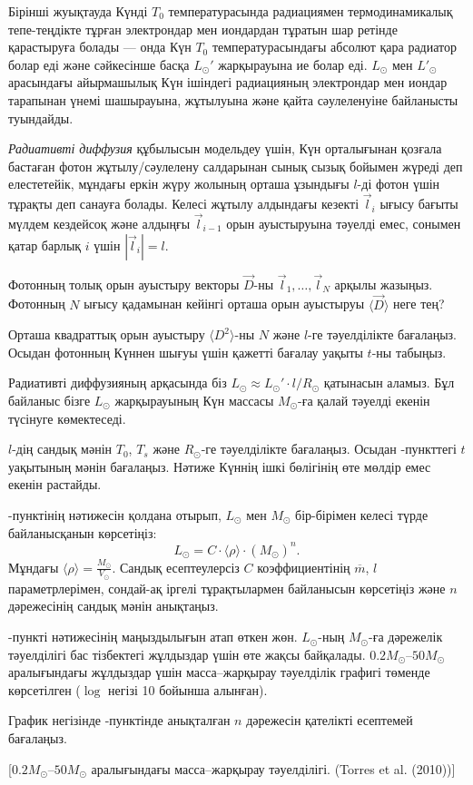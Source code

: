 
Бірінші жуықтауда Күнді $T_0$ температурасында радиациямен термодинамикалық тепе-теңдікте тұрған электрондар мен иондардан тұратын шар ретінде қарастыруға болады --- онда Күн $T_0$ температурасындағы абсолют қара радиатор болар еді және сәйкесінше басқа $L_\odot'$ жарқырауына ие болар еді. $L_\odot$ мен $L'_\odot$ арасындағы айырмашылық Күн ішіндегі радиацияның электрондар мен иондар тарапынан үнемі шашырауына, жұтылуына және қайта сәулеленуіне байланысты туындайды.

\textit{Радиативті диффузия} құбылысын модельдеу үшін, Күн орталығынан қозғала бастаған фотон жұтылу/сәулелену салдарынан сынық сызық бойымен жүреді деп елестетейік, мұндағы еркін жүру жолының орташа ұзындығы $l$-ді фотон үшін тұрақты деп санауға болады. Келесі жұтылу алдындағы кезекті $\vec l_i$ ығысу бағыты мүлдем кездейсоқ және алдыңғы $\vec l_{i-1}$ орын ауыстыруына тәуелді емес, сонымен қатар барлық $i$ үшін $|\vec l_i|=l$.

\begin{task}
\item Фотонның толық орын ауыстыру векторы $\vec D$-ны $\vec l_1,\dots,\vec l_N$ арқылы жазыңыз. Фотонның $N$ ығысу қадамынан кейінгі орташа орын ауыстыруы $\langle\vec D\rangle$ неге тең?
\item Орташа квадраттық орын ауыстыру $\langle D^2\rangle$-ны $N$ және $l$-ге тәуелділікте бағалаңыз. Осыдан фотонның Күннен шығуы үшін қажетті бағалау уақыты $t$-ны табыңыз.
\end{task}
Радиативті диффузияның арқасында біз $L_\odot \approx L_\odot'\cdot l/R_\odot$ қатынасын аламыз. Бұл байланыс бізге $L_\odot$ жарқырауының Күн массасы $M_\odot$-ға қалай тәуелді екенін түсінуге көмектеседі.
\begin{task}
\item $l$-дің сандық мәнін $T_0$, $T_s$ және $R_\odot$-ге тәуелділікте бағалаңыз. Осыдан -пункттегі $t$ уақытының мәнін бағалаңыз. Нәтиже Күннің ішкі бөлігінің өте мөлдір емес екенін растайды.
\item {}-пунктінің нәтижесін қолдана отырып, $L_\odot$ мен $M_\odot$ бір-бірімен келесі түрде байланысқанын көрсетіңіз:
$$
L_\odot = C\cdot\langle\rho\rangle\cdot(M_\odot)^n.
$$
Мұндағы $\langle\rho\rangle=\frac{M_\odot}{V_\odot}$. Сандық есептеулерсіз $C$ коэффициентінің $\overline m$, $l$ параметрлерімен, сондай-ақ іргелі тұрақтылармен байланысын көрсетіңіз және $n$ дәрежесінің сандық мәнін анықтаңыз.
\end{task}
-пункті нәтижесінің маңыздылығын атап өткен жөн. $L_\odot$-ның $M_\odot$-ға дәрежелік тәуелділігі бас тізбектегі жұлдыздар үшін өте жақсы байқалады. $0.2M_\odot$--$50M_\odot$ аралығындағы жұлдыздар үшін масса--жарқырау тәуелділік графигі төменде көрсетілген ($\log$ негізі 10 бойынша алынған).
\begin{task}
\item График негізінде -пунктінде анықталған $n$ дәрежесін қателікті есептемей бағалаңыз.
\end{task}

[$0.2M_\odot$--$50M_\odot$ аралығындағы масса--жарқырау тәуелділігі. (Torres et al. (2010))]

